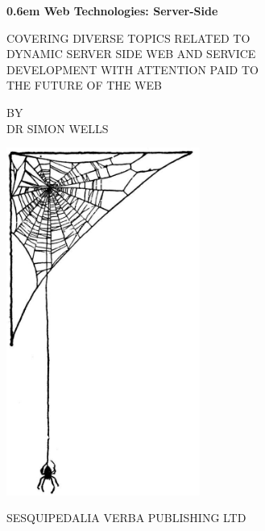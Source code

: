 \documentclass[12pt, a4paper, oneside]{book}
\begin{document}
\clearpage
\newcommand\nbvspace[1][3]{\vspace*{\stretch{#1}}}
\newcommand\nbstretchyspace{\spaceskip0.5em plus 0.25em minus 0.25em}
\newcommand{\nbtitlestretch}{\spaceskip0.6em}
\pagestyle{empty}
\begin{center}
\bfseries
\nbvspace[1]
\Huge
{\nbtitlestretch\huge
Web Technologies: Server-Side}

\nbvspace[1]
\normalsize

COVERING DIVERSE TOPICS RELATED TO \\
DYNAMIC SERVER SIDE WEB AND SERVICE \\ 
DEVELOPMENT WITH ATTENTION PAID TO \\
THE FUTURE OF THE WEB

\nbvspace[1]
\small BY\\
\Large DR SIMON WELLS\\[0.5em]

\nbvspace[2]

\includegraphics[width=2.5in]{images/cover}
\nbvspace[3]
\normalsize

\large
SESQUIPEDALIA VERBA PUBLISHING LTD
\nbvspace[1]
\end{center}

\setcounter{tocdepth}{2}
\cleardoublepage
\tableofcontents
\listoffigures
{}
\end{document}
